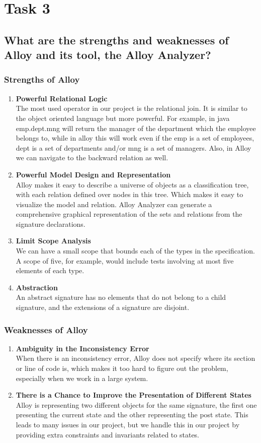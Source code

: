 \documentclass[titlepage]{article}
\begin{document}
\section{Task 3}
\subsection{What are the strengths and weaknesses of Alloy and its tool, the Alloy Analyzer?}
\subsubsection{Strengths of Alloy}
\begin{enumerate}
	\item \textbf{Powerful Relational Logic} \\
	The most used operator in our project is the relational join. It is similar to the object oriented language but more powerful. For example, in java emp.dept.mng will return the manager of the department which the employee belongs to, while in alloy this will work even if the emp is a set of employees, dept is a set of departments and/or mng is a set of managers. Also, in Alloy we can navigate to the backward relation as well.
	\item \textbf{Powerful Model Design and Representation} \\
	Alloy makes it easy to describe a universe of objects as a classification tree, with each relation defined over nodes in this tree. Which makes it easy to visualize the model and relation. Alloy Analyzer can generate a comprehensive graphical representation of the sets and relations from the signature declarations.
	\item \textbf{Limit Scope Analysis} \\
	We can have a small scope that bounds each of the types in the specification. A scope of five, for example, would include tests involving at most five elements of each type.
	\item \textbf{Abstraction} \\
	An abstract signature has no elements that do not belong to a child signature, and the extensions of a signature are disjoint. 
\end{enumerate}
\subsubsection{Weaknesses of Alloy}
\begin{enumerate}
	\item \textbf{Ambiguity in the Inconsistency Error} \\
	When there is an inconsistency error, Alloy does not specify where its section or line of code is, which makes it too hard to figure out the problem, especially when we work in a large system.
	\item \textbf{There is a Chance to Improve the Presentation of Different States} \\
	Alloy is representing two different objects for the same signature, the first one presenting the current state and the other representing the post state. This leads to many issues in our project, but we handle this in our project by providing extra constraints and invariants related to states.
\end{enumerate}
\end{document}
